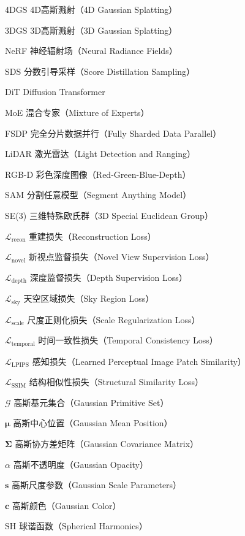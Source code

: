 
\begin{denotation}[4cm]
  \item[4DGS] 4D高斯溅射（4D Gaussian Splatting）
  \item[3DGS] 3D高斯溅射（3D Gaussian Splatting）
  \item[NeRF] 神经辐射场（Neural Radiance Fields）
  \item[SDS] 分数引导采样（Score Distillation Sampling）
  \item[DiT] Diffusion Transformer
  \item[MoE] 混合专家（Mixture of Experts）
  \item[FSDP] 完全分片数据并行（Fully Sharded Data Parallel）
  \item[LiDAR] 激光雷达（Light Detection and Ranging）
  \item[RGB-D] 彩色深度图像（Red-Green-Blue-Depth）
  \item[SAM] 分割任意模型（Segment Anything Model）
  \item[SE(3)] 三维特殊欧氏群（3D Special Euclidean Group）
  
  \item[$\mathcal{L}_{\text{recon}}$] 重建损失（Reconstruction Loss）
  \item[$\mathcal{L}_{\text{novel}}$] 新视点监督损失（Novel View Supervision Loss）
  \item[$\mathcal{L}_{\text{depth}}$] 深度监督损失（Depth Supervision Loss）
  \item[$\mathcal{L}_{\text{sky}}$] 天空区域损失（Sky Region Loss）
  \item[$\mathcal{L}_{\text{scale}}$] 尺度正则化损失（Scale Regularization Loss）
  \item[$\mathcal{L}_{\text{temporal}}$] 时间一致性损失（Temporal Consistency Loss）
  \item[$\mathcal{L}_{\text{LPIPS}}$] 感知损失（Learned Perceptual Image Patch Similarity）
  \item[$\mathcal{L}_{\text{SSIM}}$] 结构相似性损失（Structural Similarity Loss）
  
  \item[$\mathcal{G}$] 高斯基元集合（Gaussian Primitive Set）
  \item[$\boldsymbol{\mu}$] 高斯中心位置（Gaussian Mean Position）
  \item[$\boldsymbol{\Sigma}$] 高斯协方差矩阵（Gaussian Covariance Matrix）
  \item[$\alpha$] 高斯不透明度（Gaussian Opacity）
  \item[$\mathbf{s}$] 高斯尺度参数（Gaussian Scale Parameters）
  \item[$\mathbf{c}$] 高斯颜色（Gaussian Color）
  \item[SH] 球谐函数（Spherical Harmonics）
  

\end{denotation}
